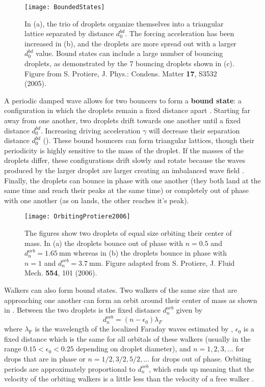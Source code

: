 \begin{figure}[h]
	       \centering
	    \texttt{[image: BoundedStates]}
	     \caption{In (a), the trio of droplets organize themselves into a triangular lattice separated by distance $d_{0}^{bd}$. The forcing acceleration has been increased in (b), and the droplets are more spread out with a larger $d_{0}^{bd}$ value. Bound states can include a large number of bouncing droplets, as demonstrated by the 7 bouncing droplets shown in (c).   
	    Figure from S. Protiere, J. Phys.: Condens. Matter \textbf{17}, S3532 (2005). 
	     }
	 \label{bounded}
	\end{figure}
            A periodic damped wave allows for two bouncers to form a \textbf{bound state}: a configuration in which the droplets remain a fixed distance apart .  Starting far away from one another, two droplets drift towards one another until a fixed distance $d_{0}^{bd}$. Increasing driving acceleration $\gamma$ will decrease their separation distance $d_{0}^{bd}$ (). These bound bouncers can form triangular lattices, though their periodicity is highly sensitive to the mass of the droplet. If the masses of the droplets differ, these configurations drift slowly and rotate because the waves produced by the larger droplet are larger creating an imbalanced wave field . Finally, the droplets can bounce in phase with one another (they both land at the same time and reach their peaks at the same time) or completely out of phase with one another (as on lands, the other reaches it's peak).
            
\begin{figure}[h]
	       \centering
	    \texttt{[image: OrbitingProtiere2006]}
	     \caption{ The figures show two droplets of equal size orbiting their center of mass. In (a) the droplets bounce out of phase with $n = 0.5$ and $d_{n}^{orb} =1.65~\mathrm{mm}$ whereas in (b) the droplets bounce in phase with  $n=1$ and  $d_{n}^{orb} = 3.7~\mathrm{mm}$.
	    Figure adapted from S. Protiere, J. Fluid Mech. \textbf{554}, 101 (2006). 
	     }
	 \label{orbiting}
	\end{figure}
 

            Walkers can also form bound states. Two walkers of the same size that are approaching one another can form an orbit around their center of mass as shown in . Between the two droplets is the fixed distance $d_{n}^{orb}$ given by          
\begin{equation} \label{orbital}
d_{n}^{orb} = (n - \epsilon_0)\lambda_F
\end{equation}         
where $\lambda_\mathrm{F}$ is the wavelength of the localized Faraday waves estimated by , $\epsilon_0$ is a fixed distance which is the same for all orbitals of these walkers (usually in the range $0.15 < \epsilon_0 < 0.25$ depending on droplet diameter), and $n = 1,2,3,...$ for drops that are in phase or $n = 1/2, 3/2, 5/2,...$ for drops out of phase. Orbiting periods are approximately proportional to $d_{n}^{orb}$, which ends up meaning that the velocity of the orbiting walkers is a little less than the velocity of a free walker . 


